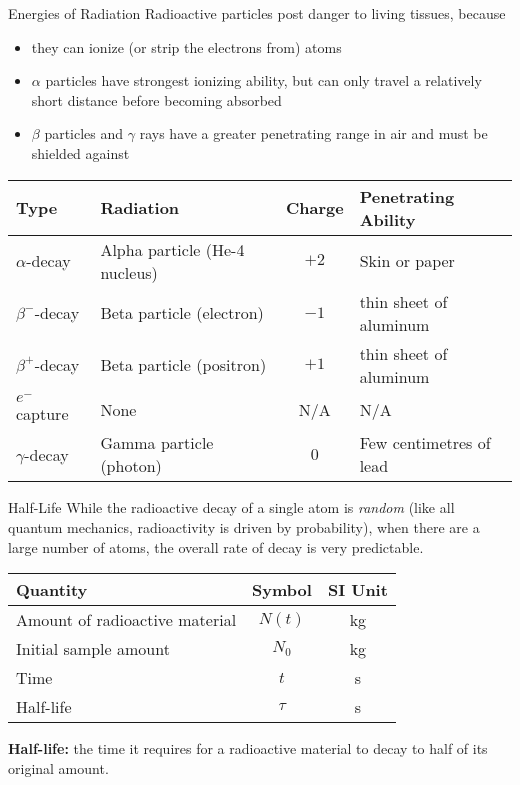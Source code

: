 \documentclass[12pt,compress,aspectratio=169]{beamer}
\begin{document}
\begin{frame}{Energies of Radiation}
  Radioactive particles post danger to living tissues, because
  \begin{itemize}
  \item they can ionize (or strip the electrons from) atoms
  \item $\alpha$ particles have strongest ionizing ability, but can only travel
    a relatively short distance before becoming absorbed
  \item $\beta$ particles and $\gamma$ rays have a greater penetrating range in
    air and must be shielded against
  \end{itemize}
  \begin{tabular}{l|l|c|l}
    \rowcolor{pink}
    \textbf{Type} & \textbf{Radiation} & \textbf{Charge} &
    \textbf{Penetrating Ability}\\ \hline
    $\alpha$-decay  & Alpha particle (He-4 nucleus) & $+2$ & Skin or paper\\
    $\beta^-$-decay & Beta particle (electron) & $-1$ & thin sheet of aluminum\\
    $\beta^+$-decay & Beta particle (positron) & $+1$ & thin sheet of aluminum\\
    $e^-$ capture   & None & N/A  & N/A \\
    $\gamma$-decay  & Gamma particle (photon) & $0$ & Few centimetres of lead
  \end{tabular}
\end{frame}



\begin{frame}{Half-Life}
  While the radioactive decay of a single atom is \emph{random} (like all
  quantum mechanics, radioactivity is driven by probability), when there are a
  large number of atoms, the overall rate of decay is very predictable.
  
  \begin{center}
    \begin{tabular}{l|c|c}
      \rowcolor{pink}
      \textbf{Quantity}      & \textbf{Symbol} & \textbf{SI Unit} \\ \hline
      Amount of radioactive material & $N(t)$  & \si{\kilogram}\\
      Initial sample amount          & $N_0$   & \si{\kilo\gram}\\
      Time                           & $t$     & \si{\second} \\
      Half-life                      & $\tau$  & \si{\second}
    \end{tabular}
  \end{center}
  \textbf{Half-life:} the time it requires for a radioactive material to decay
  to half of its original amount.
\end{frame}
\end{document}
